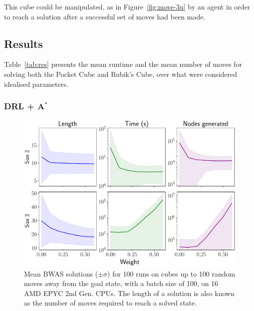 \documentclass[UKenglish]{svproc}
\begin{document}
This cube could be manipulated, as in Figure~\ref{fig:move-3u} by an agent in order to reach a solution after a successful set of moves had been made.

\subsection{Results}

Table~\ref{tab:res} presents the mean runtime and the mean number of moves for solving both the Pocket Cube and Rubik's Cube, over what were considered idealised parameters.


\subsubsection{DRL + A$^{\ast}$}

\begin{figure}[!ht]
  \centering
  \includegraphics[width=0.7\linewidth]{bwas}
  \caption{Mean BWAS solutions ($\pm\sigma$) for 100 runs on cubes up to 100
    random moves away from the goal state, with a batch size of 100, on 16 AMD
    EPYC 2nd Gen. CPUs. The length of a solution is also known as the number of
    moves required to reach a solved state.}
  \label{fig:bwas}
\end{figure}
\end{document}
